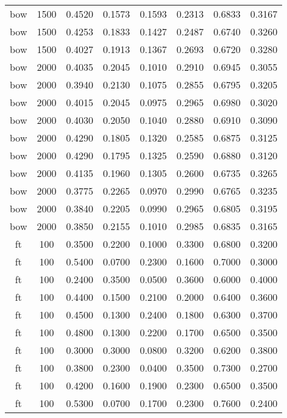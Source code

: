 \begin{scriptsize}
\begin{longtable}{cccccccc}
		bow      & 1500 & 0.4520 & 0.1573 & 0.1593 & 0.2313 & 0.6833 & 0.3167 \\
		bow      & 1500 & 0.4253 & 0.1833 & 0.1427 & 0.2487 & 0.6740 & 0.3260 \\
		bow      & 1500 & 0.4027 & 0.1913 & 0.1367 & 0.2693 & 0.6720 & 0.3280 \\
		bow      & 2000 & 0.4035 & 0.2045 & 0.1010 & 0.2910 & 0.6945 & 0.3055 \\
		bow      & 2000 & 0.3940 & 0.2130 & 0.1075 & 0.2855 & 0.6795 & 0.3205 \\
		bow      & 2000 & 0.4015 & 0.2045 & 0.0975 & 0.2965 & 0.6980 & 0.3020 \\
		bow      & 2000 & 0.4030 & 0.2050 & 0.1040 & 0.2880 & 0.6910 & 0.3090 \\
		bow      & 2000 & 0.4290 & 0.1805 & 0.1320 & 0.2585 & 0.6875 & 0.3125 \\
		bow      & 2000 & 0.4290 & 0.1795 & 0.1325 & 0.2590 & 0.6880 & 0.3120 \\
		bow      & 2000 & 0.4135 & 0.1960 & 0.1305 & 0.2600 & 0.6735 & 0.3265 \\
		bow      & 2000 & 0.3775 & 0.2265 & 0.0970 & 0.2990 & 0.6765 & 0.3235 \\
		bow      & 2000 & 0.3840 & 0.2205 & 0.0990 & 0.2965 & 0.6805 & 0.3195 \\
		bow      & 2000 & 0.3850 & 0.2155 & 0.1010 & 0.2985 & 0.6835 & 0.3165 \\
		ft       & 100  & 0.3500 & 0.2200 & 0.1000 & 0.3300 & 0.6800 & 0.3200 \\
		ft       & 100  & 0.5400 & 0.0700 & 0.2300 & 0.1600 & 0.7000 & 0.3000 \\
		ft       & 100  & 0.2400 & 0.3500 & 0.0500 & 0.3600 & 0.6000 & 0.4000 \\
		ft       & 100  & 0.4400 & 0.1500 & 0.2100 & 0.2000 & 0.6400 & 0.3600 \\
		ft       & 100  & 0.4500 & 0.1300 & 0.2400 & 0.1800 & 0.6300 & 0.3700 \\
		ft       & 100  & 0.4800 & 0.1300 & 0.2200 & 0.1700 & 0.6500 & 0.3500 \\
		ft       & 100  & 0.3000 & 0.3000 & 0.0800 & 0.3200 & 0.6200 & 0.3800 \\
		ft       & 100  & 0.3800 & 0.2300 & 0.0400 & 0.3500 & 0.7300 & 0.2700 \\
		ft       & 100  & 0.4200 & 0.1600 & 0.1900 & 0.2300 & 0.6500 & 0.3500 \\
		ft       & 100  & 0.5300 & 0.0700 & 0.1700 & 0.2300 & 0.7600 & 0.2400 \\

\end{longtable}
\end{scriptsize}
